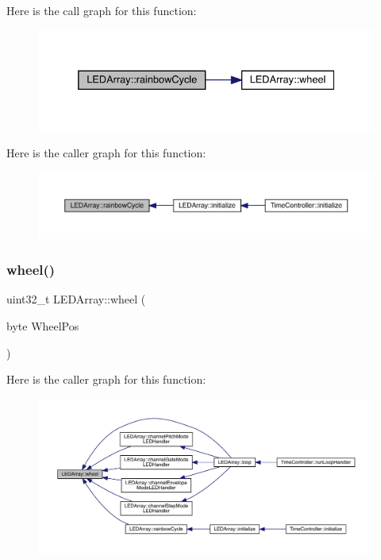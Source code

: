 Here is the call graph for this function\+:
\nopagebreak
\begin{figure}[H]
\begin{center}
\leavevmode
\includegraphics[width=332pt]{class_l_e_d_array_af787dadd33b8c2049de93f8e91bc60ab_cgraph}
\end{center}
\end{figure}
Here is the caller graph for this function\+:
\nopagebreak
\begin{figure}[H]
\begin{center}
\leavevmode
\includegraphics[width=350pt]{class_l_e_d_array_af787dadd33b8c2049de93f8e91bc60ab_icgraph}
\end{center}
\end{figure}
\mbox{\label{class_l_e_d_array_a783c6a0ef721d76b6b65aead2322e059}} 
\subsubsection{\texorpdfstring{wheel()}{wheel()}}
{\footnotesize\ttfamily uint32\+\_\+t L\+E\+D\+Array\+::wheel (\begin{DoxyParamCaption}\item[{byte}]{Wheel\+Pos }\end{DoxyParamCaption})}

Here is the caller graph for this function\+:
\nopagebreak
\begin{figure}[H]
\begin{center}
\leavevmode
\includegraphics[width=350pt]{class_l_e_d_array_a783c6a0ef721d76b6b65aead2322e059_icgraph}
\end{center}
\end{figure}


